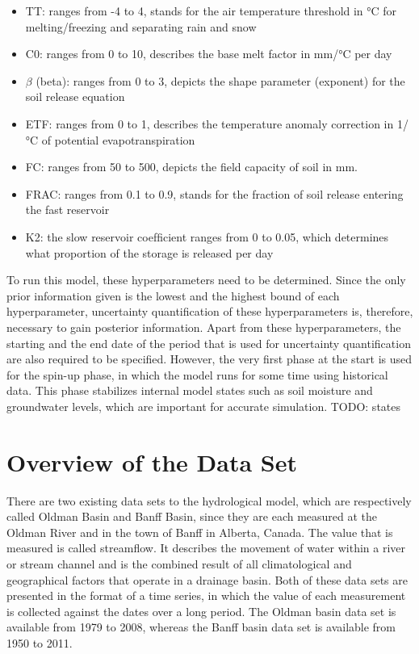 \begin{itemize}
  \item TT: ranges from -4 to 4, stands for the air temperature threshold in °C for melting/freezing and separating rain and snow
  \item C0: ranges from 0 to 10, describes the base melt factor in mm/°C per day
  \item $\beta$ (beta): ranges from 0 to 3, depicts the shape parameter (exponent) for the soil release equation
  \item ETF: ranges from 0 to 1, describes the temperature anomaly correction in 1/°C of potential evapotranspiration
  \item FC: ranges from 50 to 500, depicts the field capacity of soil in mm.
  \item FRAC: ranges from 0.1 to 0.9, stands for the fraction of soil release entering the fast reservoir
  \item K2: the slow reservoir coefﬁcient ranges from 0 to 0.05, which determines what proportion of the storage is released per day
\end{itemize}

To run this model, these hyperparameters need to be determined. Since the only prior information given is the lowest and the highest bound of each hyperparameter, uncertainty quantification of these hyperparameters is, therefore, necessary to gain posterior information. Apart from these hyperparameters, the starting and the end date of the period that is used for uncertainty quantification are also required to be specified. However, the very first phase at the start is used for the spin-up phase, in which the model runs for some time using historical data. This phase stabilizes internal model states such as soil moisture and groundwater levels, which are important for accurate simulation.
TODO: states

\section{Overview of the Data Set}
There are two existing data sets to the hydrological model, which are respectively called Oldman Basin and Banff Basin, since they are each measured at the Oldman River and in the town of Banff in Alberta, Canada.\cite{hydrology_dataset} The value that is measured is called streamflow. It describes the movement of water within a river or stream channel and is the combined result of all climatological and geographical factors that operate in a drainage basin.\cite{streamflow} Both of these data sets are presented in the format of a time series, in which the value of each measurement is collected against the dates over a long period. The Oldman basin data set is available from 1979 to 2008, whereas the Banff basin data set is available from 1950 to 2011.\cite{hydrology}

